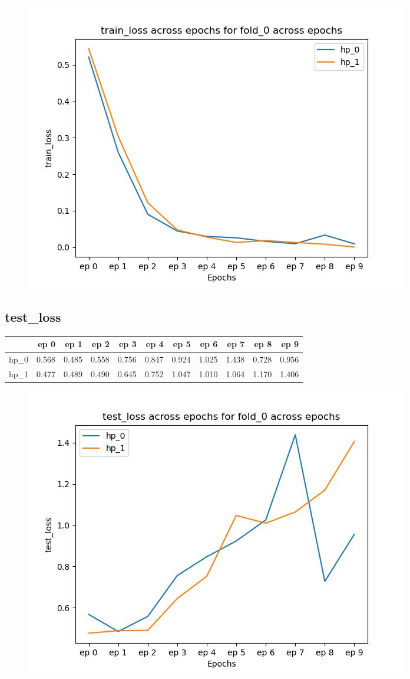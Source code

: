 \documentclass{article}
\begin{document}
\begin{figure}[H]
\includegraphics[scale = 0.75]{fold_0/train_loss}
\end{figure}
\subsection{test\_loss}
\begin{tabular}{lrrrrrrrrrr}
\toprule
{} &   ep 0 &   ep 1 &   ep 2 &   ep 3 &   ep 4 &   ep 5 &   ep 6 &   ep 7 &   ep 8 &   ep 9 \\
\midrule
hp\_0 &  0.568 &  0.485 &  0.558 &  0.756 &  0.847 &  0.924 &  1.025 &  1.438 &  0.728 &  0.956 \\
hp\_1 &  0.477 &  0.489 &  0.490 &  0.645 &  0.752 &  1.047 &  1.010 &  1.064 &  1.170 &  1.406 \\
\bottomrule
\end{tabular}

\begin{figure}[H]
\includegraphics[scale = 0.75]{fold_0/test_loss}
\end{figure}
\end{document}
